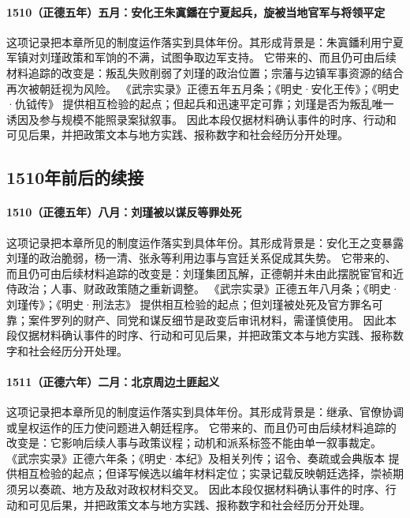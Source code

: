 \paragraph{1510（正德五年）五月：安化王朱寘鐇在宁夏起兵，旋被当地官军与将领平定} 这项记录把本章所见的制度运作落实到具体年份。其形成背景是：朱寘鐇利用宁夏军镇对刘瑾政策和军饷的不满，试图争取边军支持。 它带来的、而且仍可由后续材料追踪的改变是：叛乱失败削弱了刘瑾的政治位置；宗藩与边镇军事资源的结合再次被朝廷视为风险。 《武宗实录》正德五年五月条；《明史·安化王传》；《明史·仇钺传》 提供相互检验的起点；但起兵和迅速平定可靠；刘瑾是否为叛乱唯一诱因及参与规模不能照录案狱叙事。 因此本段仅据材料确认事件的时序、行动和可见后果，并把政策文本与地方实践、报称数字和社会经历分开处理。

\subsection{1510年前后的续接}

\paragraph{1510（正德五年）八月：刘瑾被以谋反等罪处死} 这项记录把本章所见的制度运作落实到具体年份。其形成背景是：安化王之变暴露刘瑾的政治脆弱，杨一清、张永等利用边事与宫廷关系促成其失势。 它带来的、而且仍可由后续材料追踪的改变是：刘瑾集团瓦解，正德朝并未由此摆脱宦官和近侍政治；人事、财政政策随之重新调整。 《武宗实录》正德五年八月条；《明史·刘瑾传》；《明史·刑法志》 提供相互检验的起点；但刘瑾被处死及官方罪名可靠；案件罗列的财产、同党和谋反细节是政变后审讯材料，需谨慎使用。 因此本段仅据材料确认事件的时序、行动和可见后果，并把政策文本与地方实践、报称数字和社会经历分开处理。

\paragraph{1511（正德六年）二月：北京周边土匪起义} 这项记录把本章所见的制度运作落实到具体年份。其形成背景是：继承、官僚协调或皇权运作的压力使问题进入朝廷程序。 它带来的、而且仍可由后续材料追踪的改变是：它影响后续人事与政策议程；动机和派系标签不能由单一叙事裁定。 《武宗实录》正德六年条；《明史·本纪》及相关列传；诏令、奏疏或会典版本 提供相互检验的起点；但译写候选以编年材料定位；实录记载反映朝廷选择，崇祯期须另以奏疏、地方及敌对政权材料交叉。 因此本段仅据材料确认事件的时序、行动和可见后果，并把政策文本与地方实践、报称数字和社会经历分开处理。

